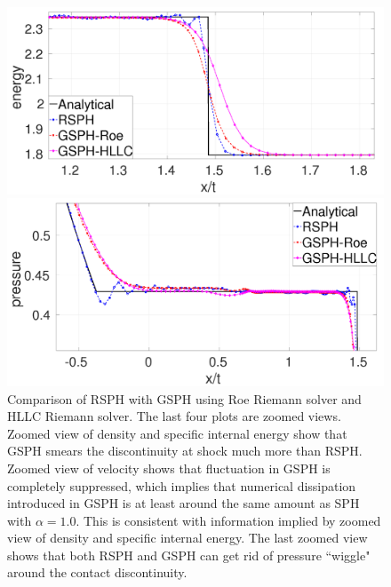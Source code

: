 \documentclass[review]{elsarticle}
\begin{document}
\begin{figure}[H]
\begin{minipage}{.495 \textwidth}
    \end{minipage}%
       \\
    \begin{minipage}{.495 \textwidth}
        \centering
        \includegraphics[width=0.99 \textwidth,height=0.6\textwidth]{./Figures/RCM-Sod-GSPH-compare-e-zoom}
    \end{minipage}%
    \begin{minipage}{.495\textwidth}
        \centering
        \includegraphics[width=0.99 \textwidth,height=0.6\textwidth]{./Figures/RCM-Sod-GSPH-compare-p-zoom}
    \end{minipage}%
    \caption{Comparison of RSPH with GSPH using Roe Riemann solver and HLLC Riemann solver. The last four plots are zoomed views. Zoomed view of density and specific internal energy show that GSPH smears the discontinuity at shock much more than RSPH. Zoomed view of velocity shows that fluctuation in GSPH is completely suppressed, which implies that numerical dissipation introduced in GSPH is at least around the same amount as SPH with $\alpha=1.0$. This is consistent with information implied by zoomed view of density and specific internal energy. The last zoomed view shows that both RSPH and GSPH can get rid of pressure ``wiggle" around the contact discontinuity.}
    \label{fig:RCM-Sod-GSPH}
\end{figure}
\end{document}
